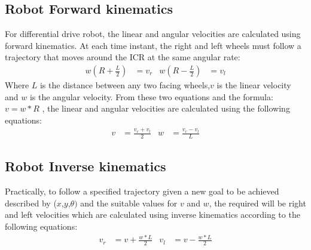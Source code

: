\subsection{Robot Forward kinematics}
\hspace{2cm}For differential drive robot, the linear and angular velocities are calculated using forward kinematics.
At each time instant, the right and left wheels must follow a trajectory that moves around the ICR at the same angular rate:
\begin{align*}
w(R + \frac{L}{2}) & = v_r  &  w(R - \frac{L}{2}) & = v_l
\end{align*}
 Where $L$  is the distance between any two facing wheels,$v$ is the linear velocity and $w$ is the angular velocity.
From these two equations and the formula: $v = w * R$ , the linear and angular velocities are calculated using the following equations:
\begin{align*}
v & = \frac{v_r + v_l}{2} & w & = \frac{v_r - v_l}{L}
\end{align*}
\subsection{Robot Inverse kinematics}
\hspace{2cm}Practically, to follow a specified trajectory given a new goal to be achieved described by ($x$,$y$,\(\theta)\) and the suitable values for $v$ and $w$, the required will be right and left velocities which are calculated using inverse kinematics according to the following equations:
\begin{align*}
v_r & = v + \frac{w * L}{2} & v_l & = v - \frac{w*L}{2}
\end{align*}
%

